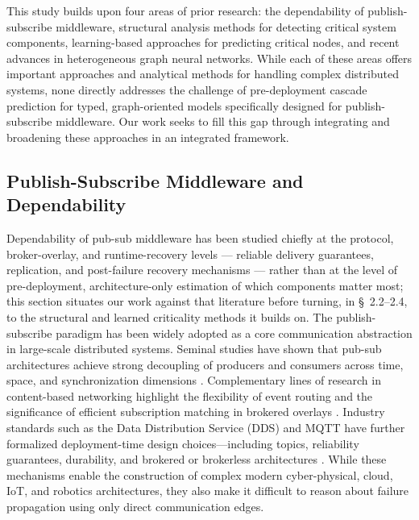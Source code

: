 \documentclass[review]{elsarticle}
\begin{document}
This study builds upon four areas of prior research: the dependability of publish-subscribe
middleware, structural analysis methods for detecting critical system components, learning-based
approaches for predicting critical nodes, and recent advances in heterogeneous graph neural
networks. While each of these areas offers important approaches and analytical methods for handling
complex distributed systems, none directly addresses the challenge of pre-deployment cascade
prediction for typed, graph-oriented models specifically designed for publish-subscribe middleware.
Our work seeks to fill this gap through integrating and broadening these approaches in an integrated
framework.

\subsection{Publish-Subscribe Middleware and Dependability}

Dependability of pub-sub middleware has been studied chiefly at the protocol, broker-overlay, and
runtime-recovery levels --- reliable delivery guarantees, replication, and post-failure recovery
mechanisms --- rather than at the level of pre-deployment, architecture-only estimation of which
components matter most; this section situates our work against that literature before turning, in
\S~2.2--2.4, to the structural and learned criticality methods it builds on. The publish-subscribe
paradigm has been widely adopted as a core communication abstraction in large-scale distributed
systems. Seminal studies have shown that pub-sub architectures achieve strong decoupling of
producers and consumers across time, space, and synchronization dimensions \cite{Eugster2003}.
Complementary lines of research in content-based networking highlight the flexibility of event
routing and the significance of efficient subscription matching in brokered overlays
\cite{Carzaniga2001}. Industry standards such as the Data Distribution Service (DDS) and MQTT have
further formalized deployment-time design choices---including topics, reliability guarantees,
durability, and brokered or brokerless architectures \cite{OMG2015DDS,OASIS2019MQTT}. While these
mechanisms enable the construction of complex modern cyber-physical, cloud, IoT, and robotics
architectures, they also make it difficult to reason about failure propagation using only direct
communication edges.
\end{document}
